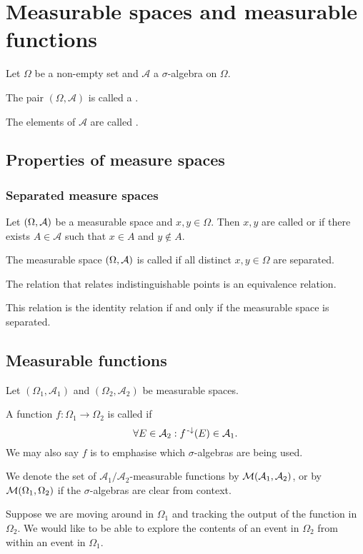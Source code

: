 \section{Measurable spaces and measurable functions}
\begin{definition}
Let $\Omega$ be a non-empty set and $\mathcal{A}$ a $\sigma$-algebra on $\Omega$.

The pair $(\Omega, \mathcal{A})$ is called a .

The elements of $\mathcal{A}$ are called .
\end{definition}


\subsection{Properties of measure spaces}
\subsubsection{Separated measure spaces}
\begin{definition}
Let $\left( \Omega,\mathcal{A} \right)$ be a measurable space and $x,y\in \Omega$. Then $x,y$ are called  or  if there exists $A\in \mathcal{A}$ such that $x\in A$ and $y\notin A$.

The measurable space $\left( \Omega,\mathcal{A} \right)$ is called  if all distinct $x,y\in \Omega$ are separated.
\end{definition}

\begin{lemma}
The relation that relates indistinguishable points is an equivalence relation.

This relation is the identity relation \textup{if and only if} the measurable space is separated.
\end{lemma}

\subsection{Measurable functions}
\begin{definition}
Let $(\Omega_1, \mathcal{A}_1)$ and $(\Omega_2, \mathcal{A}_2)$ be measurable spaces.

A function $f:\Omega_1 \to \Omega_2$ is called  if
\[ \forall E\in\mathcal{A}_2: f^{{\text{\hspace{0.15em}-}\downarrow}}(E) \in\mathcal{A}_1. \]
We may also say $f$ is  to emphasise which $\sigma$-algebras are being used.

We denote the set of $\mathcal{A}_1/\mathcal{A}_2$-measurable functions by $\operatorname{\mathcal{M}}(\mathcal{A}_1, \mathcal{A}_2)$, or by $\operatorname{\mathcal{M}}(\Omega_1, \Omega_2)$ if the $\sigma$-algebras are clear from context.
\end{definition}
Suppose we are moving around in $\Omega_1$ and tracking the output of the function in $\Omega_2$. We would like to be able to explore the contents of an event in $\Omega_2$ from within an event in $\Omega_1$.


